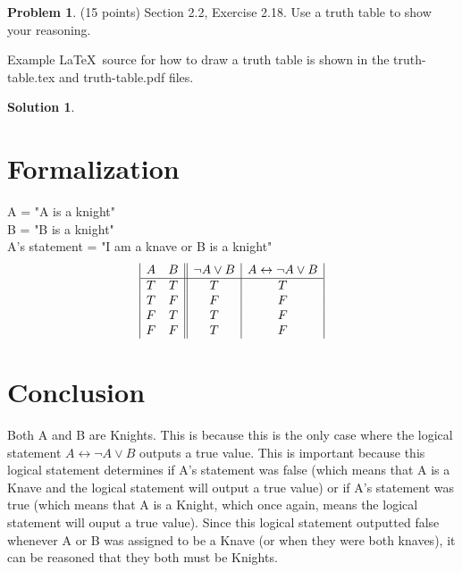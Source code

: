 \documentclass{article}
\theoremstyle{definition}
\newtheorem{problem}{Problem}
\newtheorem*{solution}{Solution}
\begin{document}
\newpage
\begin{problem} (15 points) Section 2.2, Exercise 2.18.
Use a truth table to show your reasoning. 

Example \LaTeX\ source for how to draw a truth table is shown 
in the truth-table.tex and truth-table.pdf files.
\end{problem}
\begin{solution}
\hspace{1cm}
\section*{Formalization}
A = "A is a knight"\\
B = "B is a knight"\\
A's statement = "I am a knave or B is a knight"\\
\begin{displaymath}
\begin{array}{|c c| |c|c|}
A & B & \neg A \lor B & A \leftrightarrow \neg A \lor B \\
\hline
T & T & T & T\\
T & F & F & F\\
F & T & T & F\\
F & F & T & F\\
\end{array}
\end{displaymath}
\section*{Conclusion}
Both A and B are Knights. This is because this is the only case where the logical statement $A \leftrightarrow \neg A \lor B$ outputs a true value. This is important because this logical statement determines if A's statement was false (which means that A is a Knave and the logical statement will output a true value) or if A's statement was true (which means that A is a Knight, which once again, means the logical statement will ouput a true value). Since this logical statement outputted false whenever A or B was assigned to be a Knave (or when they were both knaves), it can be reasoned that they both must be Knights.
\end{solution}
\end{document}
